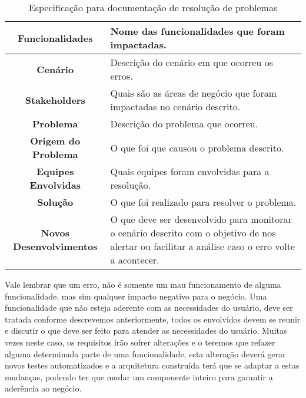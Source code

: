       \begin{table}[h!]
        \centering
        \begin{tabular}{|c|p{10cm}|}
          \hline
          \textbf{Funcionalidades} &
          Nome das funcionalidades que foram impactadas. \\ \hline
          \textbf{Cenário} &
          Descrição do cenário em que ocorreu os erros. \\ \hline
          \textbf{Stakeholders} &
          Quais são as áreas de negócio que foram impactadas no cenário descrito. \\ \hline
          \textbf{Problema} &
          Descrição do problema que ocorreu. \\ \hline
          \textbf{Origem do Problema} &
          O que foi que causou o problema descrito. \\ \hline
          \textbf{Equipes Envolvidas} &
          Quais equipes foram envolvidas para a resolução. \\ \hline
          \textbf{Solução} &
          O que foi realizado para resolver o problema. \\ \hline
          \textbf{Novos Desenvolvimentos} &
          O que deve ser desenvolvido para monitorar o cenário descrito com o
          objetivo de nos alertar ou facilitar a análise caso o erro volte a
          acontecer. \\ \hline
        \end{tabular}
        \caption{Especificação para documentação de resolução de problemas}
        \label{Tabela:12}
      \end{table}

      Vale lembrar que um erro, não é somente um mau funcionamento de alguma
      funcionalidade, mas sim qualquer impacto negativo para o negócio. Uma
      funcionalidade que não esteja aderente com as necessidades do usuário, deve
      ser tratada conforme descrevemos anteriormente, todos os envolvidos devem
      se reunir e discutir o que deve ser feito para atender as necessidades do
      usuário. Muitas vezes neste caso, os requisitos irão sofrer alterações e o
      teremos que refazer alguma determinada parte de uma funcionalidade, esta
      alteração deverá gerar novos testes automatizados e a arquitetura construída
      terá que se adaptar a estas mudanças, podendo ter que mudar um componente
      inteiro para garantir a aderência ao negócio.

